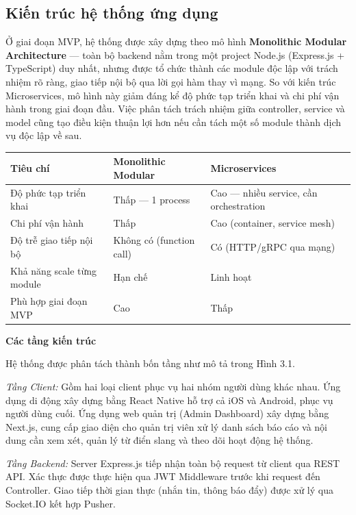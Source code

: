 \subsection{Kiến trúc hệ thống ứng dụng}

Ở giai đoạn MVP, hệ thống được xây dựng theo mô hình \textbf{Monolithic
Modular Architecture} --- toàn bộ backend nằm trong một project Node.js
(Express.js + TypeScript) duy nhất, nhưng được tổ chức thành các module
độc lập với trách nhiệm rõ ràng, giao tiếp nội bộ qua lời gọi hàm thay
vì mạng. So với kiến trúc Microservices, mô hình này giảm đáng kể độ
phức tạp triển khai và chi phí vận hành trong giai đoạn đầu. Việc phân
tách trách nhiệm giữa controller, service và model cũng tạo điều kiện
thuận lợi hơn nếu cần tách một số module thành dịch vụ độc lập về sau.

{\def\LTcaptype{none} %
\begin{longtable}{
  |>{\centering\arraybackslash}p{}
  |>{\centering\arraybackslash}p{}
  |>{\centering\arraybackslash}p{}|}
\endhead
\hline
\endlastfoot
Tiêu chí & Monolithic Modular & Microservices \\ \hline
Độ phức tạp triển khai & Thấp --- 1 process & Cao --- nhiều service, cần
orchestration \\ \hline
Chi phí vận hành & Thấp & Cao (container, service mesh) \\ \hline
Độ trễ giao tiếp nội bộ & Không có (function call) & Có (HTTP/gRPC qua
mạng) \\ \hline
Khả năng scale từng module & Hạn chế & Linh hoạt \\ \hline
Phù hợp giai đoạn MVP & Cao & Thấp \\ \hline
\end{longtable}
}

\textbf{Các tầng kiến trúc}

Hệ thống được phân tách thành bốn tầng như mô tả trong Hình 3.1.

\emph{Tầng Client:} Gồm hai loại client phục vụ hai nhóm người dùng khác
nhau. Ứng dụng di động xây dựng bằng React Native hỗ trợ cả iOS và
Android, phục vụ người dùng cuối. Ứng dụng web quản trị (Admin
Dashboard) xây dựng bằng Next.js, cung cấp giao diện cho quản trị viên
xử lý danh sách báo cáo và nội dung cần xem xét, quản lý từ điển slang
và theo dõi
hoạt động hệ thống.

\emph{Tầng Backend:} Server Express.js tiếp nhận toàn bộ request từ
client qua REST API. Xác thực được thực hiện qua JWT Middleware trước
khi request đến Controller. Giao tiếp thời gian thực (nhắn tin, thông
báo đẩy) được xử lý qua Socket.IO kết hợp Pusher.

